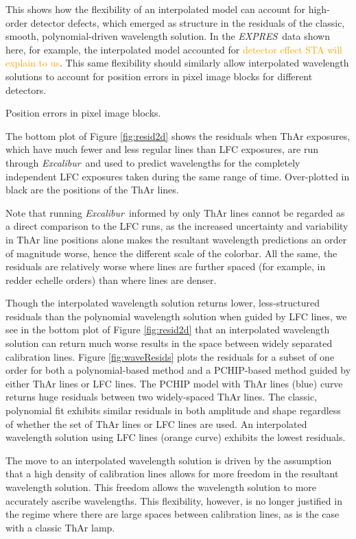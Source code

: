 \documentclass[modern]{aastex63}
\newcommand{\project}[1]{\textsl{#1}}
\newcommand{\name}{\project{Excalibur}}
\newcommand{\acronym}[1]{{\small{#1}}}
\newcommand{\expres}{\project{\acronym{EXPRES}}}
\newcommand{\lz}[1]{\textcolor{orange}{#1}}
\begin{document}
This shows how the flexibility of an interpolated model can account for high-order detector defects, which emerged as structure in the residuals of the classic, smooth, polynomial-driven wavelength solution.  In the \expres\ data shown here, for example, the interpolated model accounted for \lz{detector effect STA will explain to us}.  This same flexibility should similarly allow interpolated wavelength solutions to account for position errors in pixel image blocks for different detectors.

Position errors in pixel image blocks.

The bottom plot of Figure \ref{fig:resid2d} shows the residuals when ThAr exposures, which have much fewer and less regular lines than LFC exposures, are run through \name\ and used to predict wavelengths for the completely independent LFC exposures taken during the same range of time.  Over-plotted in black are the positions of the ThAr lines.

Note that running \name\ informed by only ThAr lines cannot be regarded as a direct comparison to the LFC runs, as the increased uncertainty and variability in ThAr line positions alone makes the resultant wavelength predictions an order of magnitude worse, hence the different scale of the colorbar.  All the same, the residuals are relatively worse where lines are further spaced (for example, in redder echelle orders) than where lines are denser.

Though the interpolated wavelength solution returns lower, less-structured residuals than the polynomial wavelength solution when guided by LFC lines, we see in the bottom plot of Figure \ref{fig:resid2d} that an interpolated wavelength solution can return much worse results in the space between widely separated calibration lines.  Figure \ref{fig:waveResids} plots the residuals for a subset of one order for both a polynomial-based method and a PCHIP-based method guided by either ThAr lines or LFC lines.   The PCHIP model with ThAr lines (blue) curve returns huge residuals between two widely-spaced ThAr lines.  The classic, polynomial fit exhibits similar residuals in both amplitude and shape regardless of whether the set of ThAr lines or LFC lines are used.  An interpolated wavelength solution using LFC lines (orange curve) exhibits the lowest residuals.

The move to an interpolated wavelength solution is driven by the assumption that a high density of calibration lines allows for more freedom in the resultant wavelength solution.  This freedom allows the wavelength solution to more accurately ascribe wavelengths.  This flexibility, however, is no longer justified in the regime where there are large spaces between calibration lines, as is the case with a classic ThAr lamp.
\end{document}
